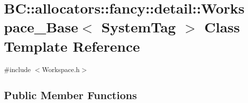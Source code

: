 \hypertarget{classBC_1_1allocators_1_1fancy_1_1detail_1_1Workspace__Base}{}\section{BC\+:\+:allocators\+:\+:fancy\+:\+:detail\+:\+:Workspace\+\_\+\+Base$<$ System\+Tag $>$ Class Template Reference}
\label{classBC_1_1allocators_1_1fancy_1_1detail_1_1Workspace__Base}


{\ttfamily \#include $<$Workspace.\+h$>$}

\subsection*{Public Member Functions}
